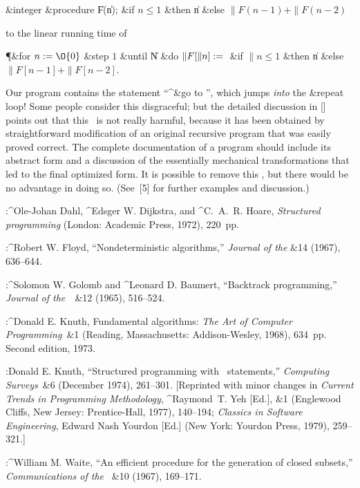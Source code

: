 \Y
\&{integer} \&{procedure} \|F(\|n); \&{if} $n \le 1$ \&{then} \|n \&{else} $\|F(n - 1) + \|F(n - 2)$
\Y


\noindent
to the linear running time of


\Y\P\&{for} $n\K \O{0}$ \&{step} $1$ \&{until} \|N \1\&{do}\6
$\|F[\|n]\mathrel{:=} {}$ \&{if} $\|n \le 1$ \&{then} \|n\5
\&{else}
$\|F[n-1] + \|F[n-2]$\2.
\Q
\Y

Our program contains the statement ``^{\&{go to}} '', which jumps {\em into\/} the \&{repeat} loop! Some people
consider this disgraceful; but the detailed discussion in\cite{5} []
points out that this \goto\ is not really harmful,
because it has been obtained by straightforward modification of an
original recursive program that was easily proved correct. The
complete documentation of a program should include its abstract form
and a discussion of the essentially mechanical transformations that
led to the final optimized form. It is possible to remove this \goto, 
but there would be no advantage in doing so. (See~[5] for
further examples and discussion.)


\belowsectionskip
\kern\parindent
{}:^{Ole-Johan Dahl}, ^{Edsger W. Dijkstra}, and ^{C.~A.~R. Hoare},
 {\sl Structured programming\/}
(London: Academic Press, 1972), 220~pp.

:^{Robert W. Floyd}, ``Nondeterministic algorithms,''
 {\sl Journal of the \ACM\/}\&{14} (1967), 636--644.

:^{Solomon W. Golomb} and ^{Leonard D. Baumert}, ``Backtrack programming,''
 {\sl Journal of the~\ACM\/}~\&{12} (1965), 516--524.

:^{Donald E. Knuth}, Fundamental algorithms: {\sl The Art of Computer
Programming\/}~\&{1}
(Reading, Massachusetts: Addison-Wesley, 1968), 634~pp.
Second edition, 1973.

:Donald E. Knuth, ``Structured programming with \goto\ statements,''
 {\sl Computing Surveys\/}~\&{6} (December 1974), 261--301.
[Re\-printed with minor changes in {\sl Current Trends in Programming
Methodology}, ^{Raymond~T. Yeh} [Ed.], \&1 (Englewood Cliffs, New Jersey:
Prentice-Hall, 1977), 140--194;
 {\sl Classics in Software Engineering}, Edward Nash
 Yourdon [Ed.] (New York: Yourdon Press, 1979), 259--321.]

:^{William M. Waite}, ``An efficient procedure for the generation
of closed subsets,'' {\sl Communications of the \ACM\/}~\&{10} (1967),
 169--171.

\vfill\eject

\endgroup

